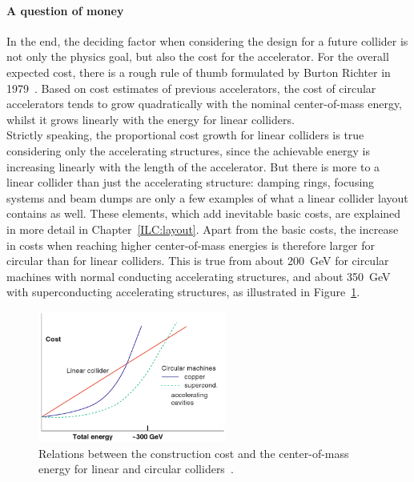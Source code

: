\paragraph{A question of money}
In the end, the deciding factor when considering the design for a future collider is not only the physics goal, but also the cost for the accelerator.
For the overall expected cost, there is a rough rule of thumb formulated by Burton Richter in 1979~\cite[p. 87ff]{Richter}.
Based on cost estimates of previous accelerators, the cost of circular accelerators tends to grow quadratically with the nominal center-of-mass energy, whilst it grows linearly with the energy for linear colliders.
\\Strictly speaking, the proportional cost growth for linear colliders is true considering only the accelerating structures, since the achievable energy is increasing linearly with the length of the accelerator.
But there is more to a linear collider than just the accelerating structure: damping rings, focusing systems and beam dumps are only a few examples of what a linear collider layout contains as well.
These elements, which add inevitable basic costs, are explained in more detail in Chapter~\ref{ILC:layout}.
Apart from the basic costs, the increase in costs when reaching higher center-of-mass energies is therefore larger for circular than for linear colliders.
This is true from about \SI{200}{\GeV} for circular machines with normal conducting accelerating structures, and about \SI{350}{\GeV} with superconducting accelerating structures, as illustrated in Figure~\ref{fig:Costs}.
\begin{figure}[h]
\centering
\includegraphics[width=0.55\textwidth]{Figures/Collider_costs.png}
\caption[Construction cost of linear and circular colliders]{Relations between the construction cost and the center-of-mass energy for linear and circular \positron\electron colliders~\cite[p. 13]{Schopper}.}
\label{fig:Costs}
\end{figure}